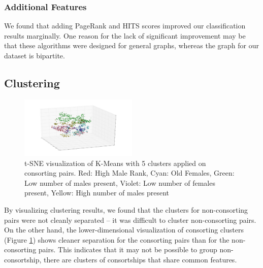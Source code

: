 \documentclass[twoside,twocolumn,paper=letter,fontsize=11pt]{article}
\begin{document}
\subsubsection*{Additional Features}


We found that adding PageRank and HITS scores improved our classification
results marginally. One reason for the lack of significant improvement may be
that these algorithms were designed for general graphs, whereas the graph for
our dataset is bipartite. 


\subsection{Clustering}
\begin{figure}[h]
      \centering
          \includegraphics[width=0.5\textwidth]{../figs/consort_kmeans_5_3d_tsne.png}
  \caption{t-SNE visualization of K-Means with 5 clusters applied on consorting
  pairs. Red: High Male Rank, Cyan: Old Females, Green: Low number of males
present, Violet: Low number of females present, Yellow: High number of males
present}
  \label{fig:consort_clustering_vis}
\end{figure}

By visualizing clustering results, we found that the clusters for non-consorting
pairs were not cleanly separated -- it was difficult to cluster non-consorting
pairs. On the other hand, the lower-dimensional visualization of consorting
clusters  (Figure \ref{fig:consort_clustering_vis}) shows cleaner separation for
the consorting pairs than for the non-consorting pairs. This indicates that it
may not be possible to group non-consortship, there are clusters of consortships
that share common features.
\end{document}
